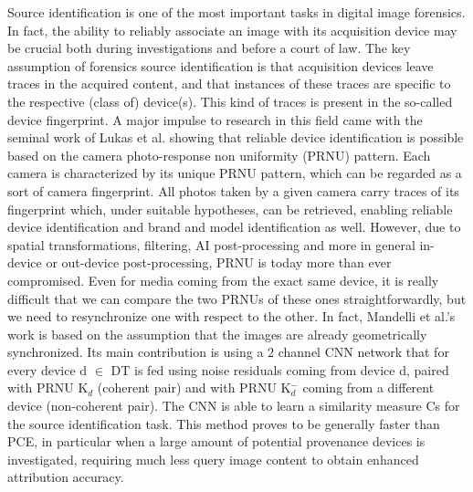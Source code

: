 Source identification is one of the most important tasks in digital image forensics. 
In fact, the ability to reliably associate an image with its acquisition device may be crucial both during investigations and before a court of law.
The key assumption of forensics source identification is that acquisition devices leave traces in the acquired content, and that instances of these traces are specific to the respective (class of) device(s). 
This kind of traces is present in the so-called device fingerprint.
A major impulse to research in this field came with the seminal work of Lukas et al.\cite{Lukas} showing that reliable device identification is possible based on the camera photo-response non uniformity (PRNU) pattern. 
Each camera is characterized by its unique PRNU pattern, which can be regarded as a sort of camera fingerprint.
All photos taken by a given camera carry traces of its fingerprint which, under suitable hypotheses, can be retrieved, enabling reliable device identification and brand and model identification as well.
However, due to spatial transformations, filtering, AI post-processing and more in general in-device or out-device post-processing, PRNU is today more than ever compromised. 
Even for media coming from the exact same device, it is really difficult that we can compare the two PRNUs of these ones straightforwardly, but we need to resynchronize one with respect to the other.
In fact, Mandelli et al.'s \cite{Mandelli} work is based on the assumption that the images are already geometrically synchronized.
Its main contribution is using a 2 channel CNN network that for every device d $\in$ DT is fed using noise residuals coming from device d, paired with PRNU K$_{d}$ (coherent pair) and with PRNU K$_{d}^{-}$ coming from a different device (non-coherent pair). 
The CNN is able to learn a similarity measure Cs for the source identification task.
This method proves to be generally faster than PCE, in particular when a large amount of potential provenance devices is investigated, requiring much less query image content to obtain enhanced attribution accuracy.
